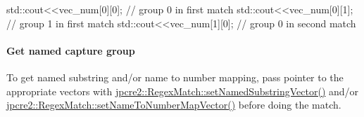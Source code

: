 \begin{DoxyCode}
std::cout<<vec\_num[0][0]; \textcolor{comment}{// group 0 in first match}
std::cout<<vec\_num[0][1]; \textcolor{comment}{// group 1 in first match}
std::cout<<vec\_num[1][0]; \textcolor{comment}{// group 0 in second match}
\end{DoxyCode}
 \hypertarget{index_get-named-capture-group}{}\paragraph{Get named capture group}\label{index_get-named-capture-group}
To get named substring and/or name to number mapping, pass pointer to the appropriate vectors with {\ttfamily \hyperlink{classjpcre2_1_1RegexMatch_ae495431f57cae54363331237ab21b56c_ae495431f57cae54363331237ab21b56c}{jpcre2\+::\+Regex\+Match\+::set\+Named\+Substring\+Vector()}} and/or {\ttfamily \hyperlink{classjpcre2_1_1RegexMatch_a04926e61d8b5f1d8bdf344efecd567d8_a04926e61d8b5f1d8bdf344efecd567d8}{jpcre2\+::\+Regex\+Match\+::set\+Name\+To\+Number\+Map\+Vector()}} before doing the match.


